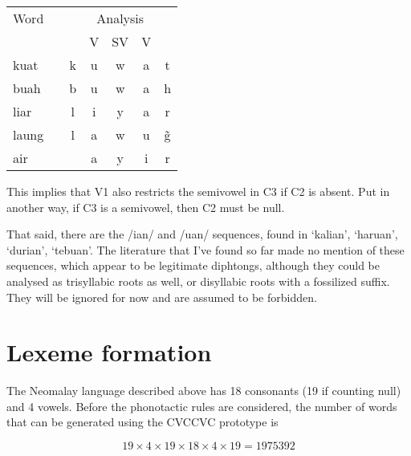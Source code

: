 \documentclass{article}
\begin{document}
\begin{center}
	\begin{tabular}{l c c c c c c}
		\toprule
		Word  & \hspace{2em} & \multicolumn{5}{c}{Analysis} \\
		      &              &   & V & SV & V &             \\ \midrule
		kuat  &              & k & u & w  & a & t           \\
		buah  &              & b & u & w  & a & h           \\
		liar  &              & l & i & y  & a & r           \\
		laung &              & l & a & w  & u & \~g         \\
		air   &              &   & a & y  & i & r           \\ \bottomrule
	\end{tabular}
\end{center}

This implies that V1 also restricts the semivowel in C3 if C2 is absent. Put in another way, if C3 is a semivowel, then C2 must be null. %

That said, there are the /ian/ and /uan/ sequences, found in `kalian', `haruan', `durian', `tebuan'. The literature that I've found so far made no mention of these sequences, which appear to be legitimate diphtongs, although they could be analysed as trisyllabic roots as well, or disyllabic roots with a fossilized suffix. They will be ignored for now and are assumed to be forbidden.


%
%
%
%

\section{Lexeme formation}

The Neomalay language described above has 18 consonants (19 if counting null) and 4 vowels. Before the phonotactic rules are considered, the number of words that can be generated using the CVCCVC prototype is

\[ 19 \times 4 \times 19 \times 18 \times 4 \times 19 = \num{1975392} \]
\end{document}
